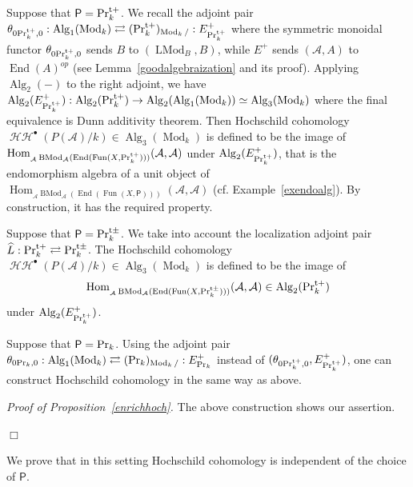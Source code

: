 \documentclass[leqno,12pt]{amsart}
\theoremstyle{plain}
\theoremstyle{definition}
\newcommand{\HH}{\operatorname{\mathcal{HH}}}
\newcommand{\PR}{\textup{Pr}}
\newcommand{\PRTT}{\textup{Pr}^{\textup{t}+}}
\newcommand{\PRTTT}{\textup{Pr}^{\textup{t}\pm}}
\newcommand{\Hom}{\operatorname{Hom}}
\newcommand{\Mod}{\operatorname{Mod}}
\newcommand{\Fun}{\operatorname{Fun}}
\newcommand{\Alg}{\operatorname{Alg}}
\newcommand{\End}{\operatorname{End}}
\newcommand{\LMod}{\operatorname{LMod}}
\newcommand{\BMod}{\operatorname{BMod}}
\newcommand{\QED}{{\unskip\nobreak\hfil\penalty50\quad\null\nobreak\hfil
{$\Box$}\parfillskip0pt\finalhyphendemerits0\par\medskip}}
\begin{document}
Suppose that $\mathsf{P}=\PRTT_k$.
We recall the adjoint pair $\theta_{0\PRTT_k,0}:\Alg_1(\Mod_k)\rightleftarrows (\PRTT_k)_{\Mod_k/}:E_{\PRTT_k}^+$
where the symmetric monoidal functor $\theta_{0\PRTT_k,0}$ sends $B$ to $(\LMod_B,B)$, while $E^+$ sends $(\mathcal{A},A)$ to $\End(A)^{op}$
(see Lemma~\ref{goodalgebraization} and its proof).
Applying $\Alg_2(-)$ to the right adjoint, we have
$\Alg_2(E_{\PRTT_k}^+):\Alg_2(\PRTT_k)\to \Alg_2(\Alg_1(\Mod_k))\simeq \Alg_3(\Mod_k)$ where the final equivalence is Dunn additivity theorem.
Then Hochschild cohomology $\HH^\bullet(P(\mathcal{A})/k)\in \Alg_{3}(\Mod_k)$ is defined to be the image of $\Hom_{{}_{\mathcal{A}}\BMod_{\mathcal{A}}(\End(\Fun(X,\PRTT_k)))}(\mathcal{A},\mathcal{A})$ under
$\Alg_2(E_{\PRTT_k}^+)$, that is
the endomorphism algebra of a unit object of $\Hom_{{}_{\mathcal{A}}\BMod_{\mathcal{A}}(\End(\Fun(X,\mathsf{P})))}(\mathcal{A},\mathcal{A})$ (cf. Example~\ref{exendoalg}).
By construction, it has the required property.

Suppose that $\mathsf{P}=\PRTTT_k$. We take into account the localization adjoint pair $\widehat{L}:\PRTT_k\rightleftarrows \PRTTT_k$.
The Hochschild cohomology $\HH^\bullet(P(\mathcal{A})/k)\in \Alg_{3}(\Mod_k)$ is defined to be the image of 
\[
\Hom_{{}_{\mathcal{A}}\BMod_{\mathcal{A}}(\End(\Fun(X,\PRTTT_k)))}(\mathcal{A},\mathcal{A})\in \Alg_2(\PRTT_k)
\]
under
$\Alg_2(E_{\PRTT_k}^+)$.




Suppose that $\mathsf{P}=\PR_k$.
Using the adjoint pair $\theta_{0\PR_k,0}:\Alg_1(\Mod_k)\rightleftarrows (\PR_k)_{\Mod_k/}:E_{\PR_k}^+$ instead of $(\theta_{0\PRTT_k,0},E_{\PRTT_k}^+)$,
one can construct Hochschild cohomology in the same way as above.


\vspace{3mm}

{\it Proof of Proposition~\ref{enrichhoch}.} The above construction shows our assertion.
\QED


We prove that in this setting Hochschild cohomology is independent of the choice of $\mathsf{P}$.
\end{document}
